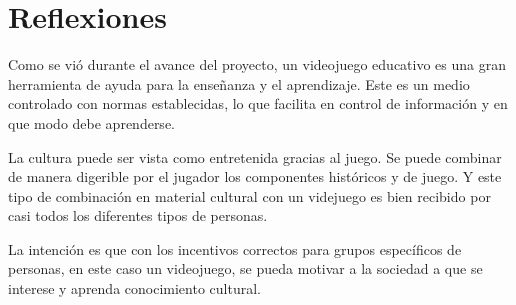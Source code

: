 \chapter{Reflexiones}


Como se vió durante el avance del proyecto, 
un videojuego educativo es una gran herramienta de ayuda para la enseñanza y el aprendizaje. Este es un medio controlado con normas establecidas, lo que facilita en control de información y en que modo debe aprenderse.

La cultura puede ser vista como entretenida gracias al juego. Se puede combinar de manera digerible por el jugador los componentes históricos y de juego. Y este tipo de combinación en material cultural con un videjuego es bien recibido por casi todos los diferentes tipos de personas.

La intención es que con los incentivos correctos para grupos específicos de personas, en este caso un videojuego, se pueda motivar a la sociedad a que se interese y aprenda conocimiento cultural. 
